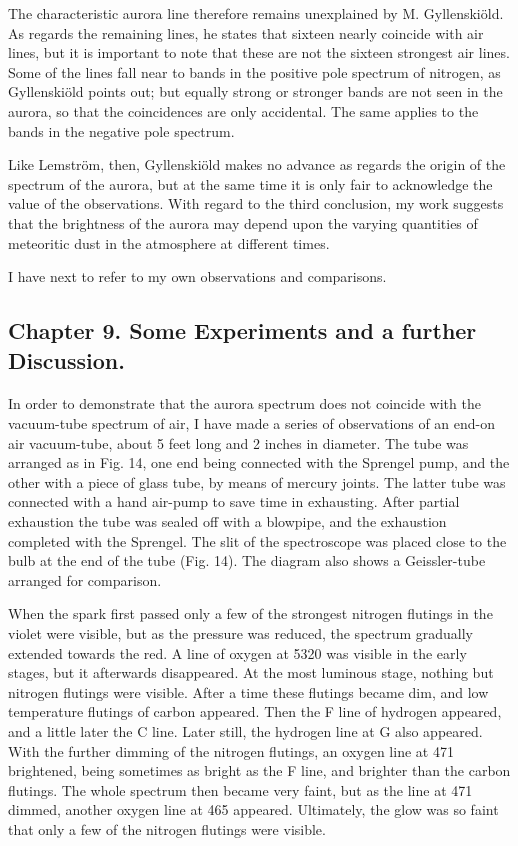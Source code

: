 \documentclass[a4paper, 12pt, oneside, polutonikogreek, english]{article}
\begin{document}
The characteristic aurora line therefore remains unexplained by M. Gyllenskiöld. As regards the remaining lines, he states that sixteen nearly coincide with air lines, but it is important to note that these are not the sixteen strongest air lines. Some of the lines fall near to bands in the positive pole spectrum of nitrogen, as Gyllenskiöld points out; but equally strong or stronger bands are not seen in the aurora, so that the coincidences are only accidental. The same applies to the bands in the negative pole spectrum.

Like Lemström, then, Gyllenskiöld makes no advance as regards the origin of the spectrum of the aurora, but at the same time it is only fair to acknowledge the value of the observations. With regard to the third conclusion, my work suggests that the brightness of the aurora may depend upon the varying quantities of meteoritic dust in the atmosphere at different times.

I have next to refer to my own observations and comparisons.
\clearpage
\subsection{Chapter 9. Some Experiments and a further Discussion.}
\paragraph{}
In order to demonstrate that the aurora spectrum does not coincide with the vacuum-tube spectrum of air, I have made a series of observations of an end-on air vacuum-tube, about 5 feet long and 2 inches in diameter. The tube was arranged as in Fig. 14, one end being connected with the Sprengel pump, and the other with a piece of glass tube, by means of mercury joints. The latter tube was connected with a hand air-pump to save time in exhausting. After partial exhaustion the tube was sealed off with a blowpipe, and the exhaustion completed with the Sprengel. The slit of the spectroscope was placed close to the bulb at the end of the tube (Fig. 14). The diagram also shows a Geissler-tube arranged for comparison.

When the spark first passed only a few of the strongest nitrogen flutings in the violet were visible, but as the pressure was reduced, the spectrum gradually extended towards the red. A line of oxygen at 5320 was visible in the early stages, but it afterwards disappeared. At the most luminous stage, nothing but nitrogen flutings were visible. After a time these flutings became dim, and low temperature flutings of carbon appeared. Then the F line of hydrogen appeared, and a little later the C line. Later still, the hydrogen line at G also appeared. With the further dimming of the nitrogen flutings, an oxygen line at 471 brightened, being sometimes as bright as the F line, and brighter than the carbon flutings. The whole spectrum then became very faint, but as the line at 471 dimmed, another oxygen line at 465 appeared. Ultimately, the glow was so faint that only a few of the nitrogen flutings were visible.
\end{document}
